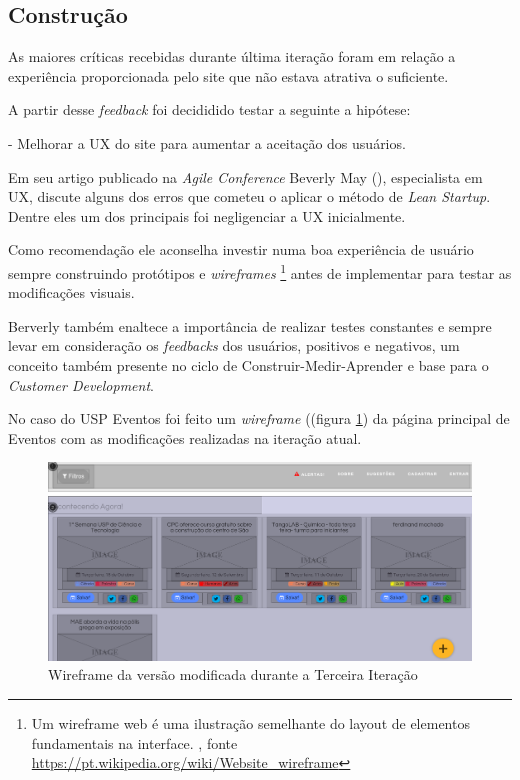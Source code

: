 \subsection{Construção}
	\par As maiores críticas recebidas durante última iteração foram em relação  a experiência proporcionada pelo site que não estava atrativa o suficiente.
	\par A partir desse \emph{feedback} foi decididido testar a seguinte a hipótese: 
	\par - Melhorar  a UX do site para aumentar a aceitação dos usuários.
	\par Em seu artigo  publicado na \emph{Agile Conference}  Beverly May (\cite{beverly:2012}), especialista em UX, discute alguns dos erros que cometeu o aplicar o método de \emph{Lean Startup}. Dentre eles um dos principais foi negligenciar a UX inicialmente.
	\par Como recomendação  ele aconselha investir numa boa experiência de usuário sempre construindo protótipos e \emph{wireframes} \footnote{ Um wireframe web é uma ilustração semelhante do layout de elementos fundamentais na interface. , fonte \url{https://pt.wikipedia.org/wiki/Website_wireframe}} antes de implementar para testar as modificações visuais.
	 \par Berverly também enaltece a importância de realizar testes constantes e sempre levar em consideração os \emph{feedbacks} dos usuários, positivos e negativos, um conceito também presente no ciclo de Construir-Medir-Aprender e base para o \emph{Customer Development}.
	\par No caso do USP Eventos foi feito um \emph{wireframe} ((figura \ref{fig:wireframe}) da página principal de Eventos com as modificações realizadas na iteração atual.
\begin{figure}[htb]
\includegraphics[width=15cm]{figuras/wireframe}
\caption{\label{fig:wireframe} Wireframe da versão modificada durante a Terceira Iteração}
\end{figure}
